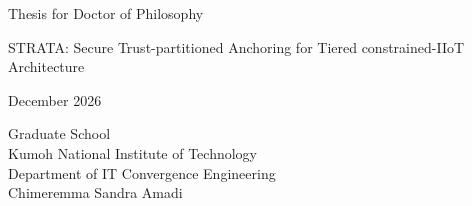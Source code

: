 \begin{titlepage}
\begin{center}
\LARGE
Thesis for Doctor of Philosophy
\vspace{2cm} %
\Huge




STRATA: Secure Trust-partitioned Anchoring for Tiered constrained-IIoT Architecture


\vfill
\LARGE

December 2026
\vspace{2cm}
\LARGE %

Graduate School \\
Kumoh National Institute of Technology \\
\vspace{0.5cm} %
Department of IT Convergence Engineering \\
\vspace{0.5cm} %
\LARGE %
Chimeremma Sandra Amadi
\vspace{2cm}
\end{center}
\end{titlepage}
